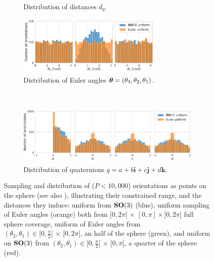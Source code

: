 \begin{figure}[ht!]
\begin{minipage}{.65\linewidth}
\begin{subfigure}[b]{0.37\linewidth}
            \caption{Distribution of distances $d_q$.}%
            \label{fig:orientation-sampling:distances}
        \end{subfigure}
        \hfill
        \begin{subfigure}[b]{0.6\linewidth}
            \centering
            \includegraphics[height=8em]{figures/uniform_quaternions_vs_angles_ang.pdf}
            \caption{Distribution of Euler angles ${\boldsymbol{\theta}} = (\theta_3,\theta_2,\theta_1)$.}
            \label{fig:distribution-angles}
        \end{subfigure}
        \\ \vspace{3em}
        \begin{subfigure}[b]{0.97\linewidth}
            \centering
            \includegraphics[height=8em]{figures/uniform_quaternions_vs_angles_q.pdf}
            \caption{Distribution of quaternions $q = a + b\boldsymbol{i} + c\boldsymbol{j} + d\boldsymbol{k}$.}
            \label{fig:distribution-quaternions}
        \end{subfigure}
    \end{minipage}
    \caption{%
        Sampling and distribution of ($P < 10,000$) orientations as points on the sphere (see also ), illustrating their constrained range, and the distances they induce: uniform from $\mathrm{\mathbf{SO}}(3)$ (blue), uniform sampling of Euler angles (orange) both from $[0,2\pi[ \, \times \, [0,\pi] \times [0,2\pi[$ full sphere coverage, uniform of Euler angles from $(\theta_2, \theta_1) \in [0,\frac{\pi}{2}[ \, \times \, [0,2\pi[$, an half of the sphere (green), and uniform on $\mathrm{\mathbf{SO}}(3)$ from $(\theta_2, \theta_1) \in [0,\frac{\pi}{2}[ \, \times \, [0,\pi[$, a quarter of the sphere (red).
    }
\end{figure}

